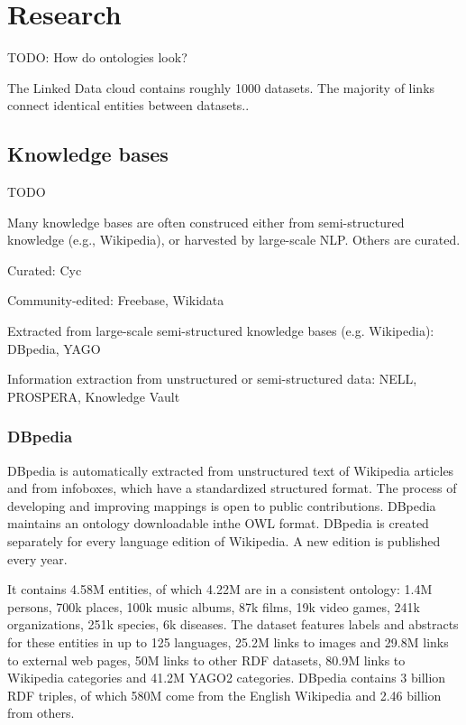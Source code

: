 \chapter{Research}

TODO: How do ontologies look?

The Linked Data cloud contains roughly 1000 datasets. The majority of links
connect identical entities between datasets.\cite{kg-refinement-survey}.

\section{Knowledge bases}

TODO

Many knowledge bases are often construced either from semi-structured knowledge
(e.g., Wikipedia), or harvested by large-scale NLP. Others are curated.

Curated: Cyc

Community-edited: Freebase, Wikidata

Extracted from large-scale semi-structured knowledge bases (e.g. Wikipedia):
DBpedia, YAGO

Information extraction from unstructured or semi-structured data: NELL,
PROSPERA, Knowledge Vault

\subsection{DBpedia}

DBpedia is automatically extracted from unstructured text of Wikipedia articles
and from infoboxes, which have a standardized structured format. The process of
developing and improving mappings is open to public contributions.
DBpedia maintains an ontology downloadable inthe OWL format.
DBpedia is created separately for every language edition of Wikipedia.
A new edition is published every year.

It contains 4.58M entities, of which 4.22M are in a consistent ontology:
1.4M persons, 700k places, 100k music albums, 87k films, 19k video games, 241k
organizations, 251k species, 6k diseases.
The dataset features labels and abstracts for these entities in up to 125
languages, 25.2M links to images and 29.8M links to external web pages,
50M links to other RDF datasets, 80.9M links to Wikipedia categories and 41.2M
YAGO2 categories.
DBpedia contains 3 billion RDF triples, of which 580M come from the English
Wikipedia and 2.46 billion from others.

